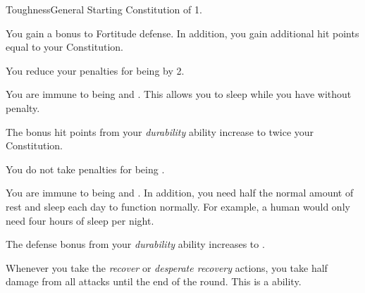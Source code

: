     \begin{feat}{Toughness}{General}
        \featpre Starting Constitution of 1.

         You gain a  bonus to Fortitude defense.
        In addition, you gain additional hit points equal to your Constitution.

         You reduce your penalties for being  by 2.

         You are immune to being  and .
        This allows you to sleep while you have  without penalty.

         The bonus hit points from your \textit{durability} ability increase to twice your Constitution.

         You do not take penalties for being .

         You are immune to being  and .
        In addition, you need half the normal amount of rest and sleep each day to function normally.
        For example, a human would only need four hours of sleep per night.

         The defense bonus from your \textit{durability} ability increases to .

         Whenever you take the \textit{recover} or \textit{desperate recovery} actions, you take half damage from all attacks until the end of the round.
        This is a  ability.
    \end{feat}

